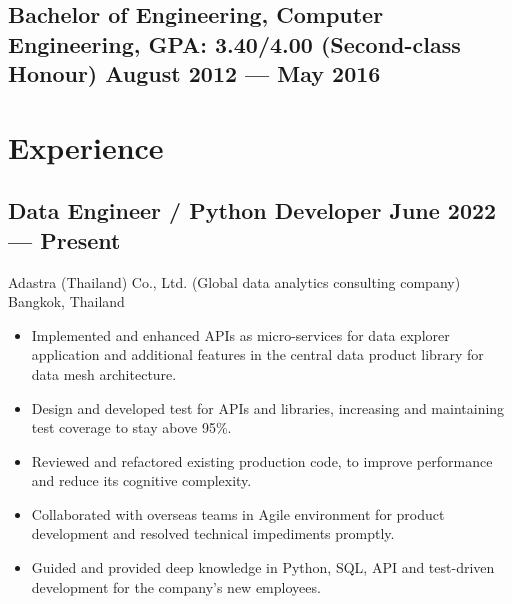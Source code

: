 \documentclass{article}
\newcommand{\subtext}[1]{
#1\par\vspace{-0.2cm}}
\newenvironment{zitemize}{
\begin{itemize}\itemsep0pt \parskip0pt \parsep1pt}
{\end{itemize}\vspace{-0.5cm}}
\begin{document}
        \subsection*{Bachelor of Engineering, Computer Engineering, {\normalsize \normalfont GPA: 3.40/4.00 \small{(Second-class Honour)}} \hfill August 2012 --- May 2016} 
        \vspace{0.2cm}

    \section{Experience}

        \subsection*{Data Engineer / Python Developer \hfill June 2022 --- Present} 
        \subtext{Adastra (Thailand) Co., Ltd. {\scriptsize (Global data analytics consulting company)} \hfill Bangkok, Thailand} 
            \vspace{0.1cm}
            \begin{zitemize}
                \item Implemented and enhanced APIs as micro-services for data explorer application and additional features in the central data product library for data mesh architecture.
                \item Design and developed test for APIs and libraries, increasing and maintaining test coverage to stay above 95\%.
                \item Reviewed and refactored existing production code, to improve performance and reduce its cognitive complexity.
                \item Collaborated with overseas teams in Agile environment for product development and resolved technical impediments promptly.
                \item Guided and provided deep knowledge in Python, SQL, API and test-driven development for the company's new employees.
            \end{zitemize}
\end{document}
